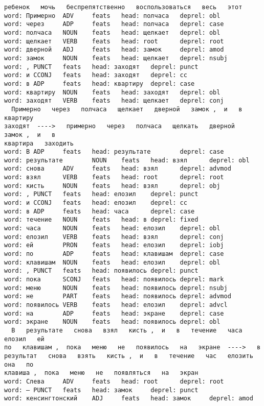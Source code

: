 \documentclass[11pt]{article}
\begin{document}
\begin{Verbatim}[commandchars=\\\{\}]
ребенок   мочь   беспрепятственно   воспользоваться   весь   этот
word: Примерно  ADV     feats   head: полчаса   deprel: obl
word: через     ADP     feats   head: полчаса   deprel: case
word: полчаса   NOUN    feats   head: щелкает   deprel: obl
word: щелкает   VERB    feats   head: root      deprel: root
word: дверной   ADJ     feats   head: замок     deprel: amod
word: замок     NOUN    feats   head: щелкает   deprel: nsubj
word: , PUNCT   feats   head: заходят   deprel: punct
word: и CCONJ   feats   head: заходят   deprel: cc
word: в ADP     feats   head: квартиру  deprel: case
word: квартиру  NOUN    feats   head: заходят   deprel: obl
word: заходят   VERB    feats   head: щелкает   deprel: conj
  Примерно   через   полчаса   щелкает   дверной   замок ,  и   в   квартиру
заходят  ---->   примерно   через   полчаса   щелкать   дверной   замок ,  и   в
квартира   заходить
word: В ADP     feats   head: результате        deprel: case
word: результате        NOUN    feats   head: взял      deprel: obl
word: снова     ADV     feats   head: взял      deprel: advmod
word: взял      VERB    feats   head: root      deprel: root
word: кисть     NOUN    feats   head: взял      deprel: obj
word: , PUNCT   feats   head: елозил    deprel: punct
word: и CCONJ   feats   head: елозил    deprel: cc
word: в ADP     feats   head: часа      deprel: case
word: течение   NOUN    feats   head: в deprel: fixed
word: часа      NOUN    feats   head: елозил    deprel: obl
word: елозил    VERB    feats   head: взял      deprel: conj
word: ей        PRON    feats   head: елозил    deprel: iobj
word: по        ADP     feats   head: клавишам  deprel: case
word: клавишам  NOUN    feats   head: елозил    deprel: obl
word: , PUNCT   feats   head: появилось deprel: punct
word: пока      SCONJ   feats   head: появилось deprel: mark
word: меню      NOUN    feats   head: появилось deprel: nsubj
word: не        PART    feats   head: появилось deprel: advmod
word: появилось VERB    feats   head: елозил    deprel: advcl
word: на        ADP     feats   head: экране    deprel: case
word: экране    NOUN    feats   head: появилось deprel: obl
  В   результате   снова   взял   кисть ,  и   в   течение   часа   елозил   ей
по   клавишам ,  пока   меню   не   появилось   на   экране  ---->   в
результат   снова   взять   кисть ,  и   в   течение   час   елозить   она   по
клавиша ,  пока   меню   не   появляться   на   экран
word: Слева     ADV     feats   head: root      deprel: root
word: – PUNCT   feats   head: замок     deprel: punct
word: кенсингтонский    ADJ     feats   head: замок     deprel: amod

\end{Verbatim}
\end{document}
